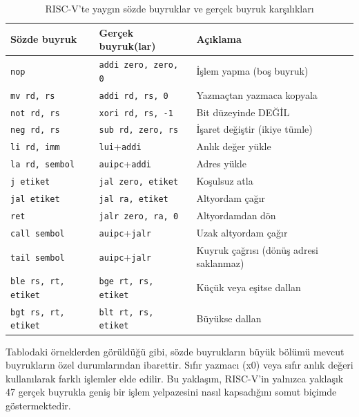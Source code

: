 \begin{table}[H]
\centering
\caption{RISC-V'te yaygın sözde buyruklar ve gerçek buyruk karşılıkları}
\label{tab:sozde-buyruklar}
\small
\begin{tabular}{lll}
\toprule
\textbf{Sözde buyruk} & \textbf{Gerçek buyruk(lar)} & \textbf{Açıklama} \\
\midrule
\texttt{nop}\index{RISC-V!nop}         & \texttt{addi zero, zero, 0}    & İşlem yapma (boş buyruk) \\
\texttt{mv rd, rs}\index{RISC-V!mv}    & \texttt{addi rd, rs, 0}        & Yazmaçtan yazmaca kopyala \\
\texttt{not rd, rs}                     & \texttt{xori rd, rs, -1}       & Bit düzeyinde DEĞİL \\
\texttt{neg rd, rs}\index{RISC-V!neg}  & \texttt{sub rd, zero, rs}      & İşaret değiştir (ikiye tümle) \\
\texttt{li rd, imm}\index{RISC-V!li}   & \texttt{lui}+\texttt{addi}     & Anlık değer yükle \\
\texttt{la rd, sembol}\index{RISC-V!la} & \texttt{auipc}+\texttt{addi}  & Adres yükle \\
\texttt{j etiket}                       & \texttt{jal zero, etiket}      & Koşulsuz atla \\
\texttt{jal etiket}                     & \texttt{jal ra, etiket}        & Altyordam çağır \\
\texttt{ret}\index{RISC-V!ret}         & \texttt{jalr zero, ra, 0}      & Altyordamdan dön \\
\texttt{call sembol}\index{RISC-V!call} & \texttt{auipc}+\texttt{jalr}  & Uzak altyordam çağır \\
\texttt{tail sembol}\index{RISC-V!tail} & \texttt{auipc}+\texttt{jalr}  & Kuyruk çağrısı (dönüş adresi saklanmaz) \\
\texttt{ble rs, rt, etiket}            & \texttt{bge rt, rs, etiket}    & Küçük veya eşitse dallan \\
\texttt{bgt rs, rt, etiket}            & \texttt{blt rt, rs, etiket}    & Büyükse dallan \\
\bottomrule
\end{tabular}
\end{table}

Tablodaki örneklerden görüldüğü gibi, sözde buyrukların büyük bölümü mevcut buyrukların özel durumlarından ibarettir. Sıfır yazmacı (x0) veya sıfır anlık değeri kullanılarak farklı işlemler elde edilir. Bu yaklaşım, RISC-V'in yalnızca yaklaşık 47 gerçek buyrukla geniş bir işlem yelpazesini nasıl kapsadığını somut biçimde göstermektedir.

